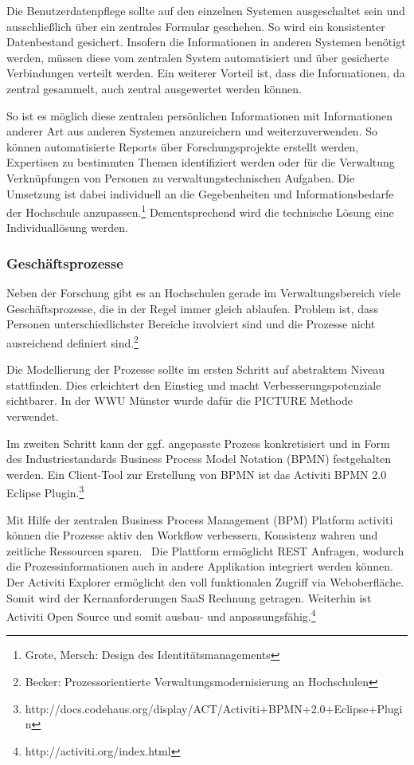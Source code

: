 \documentclass[a4paper]{article}
\begin{document}
{\sffamily
Die Benutzerdatenpflege sollte auf den einzelnen Systemen ausgeschaltet sein und ausschließlich über ein zentrales
Formular geschehen. So wird ein konsistenter Datenbestand gesichert. Insofern die Informationen in anderen Systemen
benötigt werden, müssen diese vom zentralen System automatisiert und über gesicherte Verbindungen verteilt werden. Ein
weiterer Vorteil ist, dass die Informationen, da zentral gesammelt, auch zentral ausgewertet werden können.}

{\sffamily
So ist es möglich diese zentralen persönlichen Informationen mit Informationen anderer Art aus anderen Systemen
anzureichern und weiterzuverwenden. So können automatisierte Reports über Forschungsprojekte erstellt werden,
Expertisen zu bestimmten Themen identifiziert werden oder für die Verwaltung Verknüpfungen von Personen zu
verwaltungstechnischen Aufgaben. Die Umsetzung ist dabei individuell an die Gegebenheiten und Informationsbedarfe der
Hochschule anzupassen.\footnote{Grote, Mersch: Design des Identitätsmanagements} Dementsprechend wird die technische
Lösung eine Individuallösung werden.}


\bigskip

\clearpage\subsubsection{Geschäftsprozesse}
{\sffamily
Neben der Forschung gibt es an Hochschulen gerade im Verwaltungsbereich viele Geschäftsprozesse, die in der Regel immer
gleich ablaufen. Problem ist, dass Personen unterschiedlichster Bereiche involviert sind und die Prozesse nicht
ausreichend definiert sind.\footnote{Becker: Prozessorientierte Verwaltungsmodernisierung an Hochschulen}}

{\sffamily
Die Modellierung der Prozesse sollte im ersten Schritt auf abstraktem Niveau stattfinden. Dies erleichtert den Einstieg
und macht Verbesserungspotenziale sichtbarer. In der WWU Münster wurde dafür die PICTURE Methode verwendet.}

{\sffamily
Im zweiten Schritt kann der ggf. angepasste Prozess konkretisiert und in Form des Industriestandards Business Process
Model Notation (BPMN) festgehalten werden. Ein Client-Tool zur Erstellung von BPMN ist das Activiti BPMN 2.0 Eclipse
Plugin.\footnote{http://docs.codehaus.org/display/ACT/Activiti+BPMN+2.0+Eclipse+Plugin}}

{\sffamily
Mit Hilfe der zentralen Business Process Management (BPM) Platform activiti können die Prozesse aktiv den Workflow
verbessern, Konsistenz wahren und zeitliche Ressourcen sparen. \ Die Plattform ermöglicht REST Anfragen, wodurch die
Prozessinformationen auch in andere Applikation integriert werden können. Der Activiti Explorer ermöglicht den voll
funktionalen Zugriff via Weboberfläche. Somit wird der Kernanforderungen SaaS Rechnung getragen. Weiterhin ist Activiti
Open Source und somit ausbau- und anpassungsfähig.\footnote{http://activiti.org/index.html}}
\end{document}
